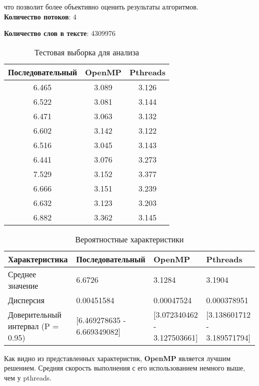 что позволит более объективно оценить результаты алгоритмов.\\

\textbf{Количество потоков}: 4

\textbf{Количество слов в тексте}: 4309976

\begin{table}[H]
	\centering
	\begin{tabular}{|c|c|c|}
		\hline
		Последовательный & OpenMP & Pthreads \\ \hline
		6.465 & 3.089 & 3.126 \\ \hline
		6.522 & 3.081 & 3.144 \\ \hline
		6.471 & 3.063 & 3.132 \\ \hline
		6.602 & 3.142 & 3.122 \\ \hline
		6.516 & 3.045 & 3.143 \\ \hline
		6.441 & 3.076 & 3.273 \\ \hline
		7.529 & 3.152 & 3.377 \\ \hline
		6.666 & 3.151 & 3.239 \\ \hline
		6.632 & 3.123 & 3.203 \\ \hline
		6.882 & 3.362 & 3.145 \\
		\hline
	\end{tabular}
	\caption{Тестовая выборка для анализа}
	\label{tab:testvalues}
\end{table}

\begin{table}[H]
	\centering
	\begin{tabular}{|M{4.5cm}|M{4cm}|M{3.5cm}|M{3.5cm}|}
		\hline
		Характеристика         & Последовательный & OpenMP      & Pthreads    \\ \hline
		Среднее значение       & 6.6726           & 3.1284      & 3.1904      \\ \hline
		Дисперсия              & 0.00451584       & 0.00047524  & 0.000378951 \\ \hline
		Доверительный интервал (P = 0.95) & [6.469278635 - 6.669349082]      & [3.072340462 - 3.127503661] & [3.138601712 - 3.189571794] \\
		\hline
	\end{tabular}
	\caption{Вероятностные характеристики}
	\label{tab:stats}
\end{table}

Как видно из представленных характеристик, \textbf{OpenMP} является лучшим решением. Средняя скорость выполнения с его использованием немного выше, чем у pthreads.

